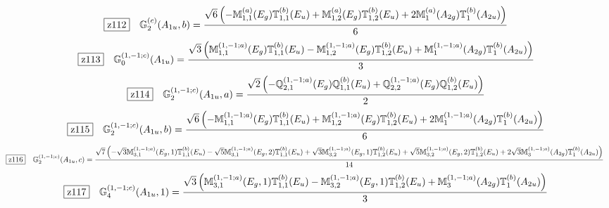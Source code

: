 \documentclass[fleqn,10pt,landscape]{jsarticle}
\begin{document}
\begin{dmath*}
\hspace*{3mm}\fbox{z112}\quad \mathbb{G}_{2}^{(c)}(A_{1u},b)=\frac{\sqrt{6} \left(- \mathbb{M}_{1,1}^{(a)}(E_{g}) \mathbb{T}_{1,1}^{(b)}(E_{u}) + \mathbb{M}_{1,2}^{(a)}(E_{g}) \mathbb{T}_{1,2}^{(b)}(E_{u}) + 2 \mathbb{M}_{1}^{(a)}(A_{2g}) \mathbb{T}_{1}^{(b)}(A_{2u})\right)}{6}
\end{dmath*}
\begin{dmath*}
\hspace*{3mm}\fbox{z113}\quad \mathbb{G}_{0}^{(1,-1;c)}(A_{1u})=\frac{\sqrt{3} \left(\mathbb{M}_{1,1}^{(1,-1;a)}(E_{g}) \mathbb{T}_{1,1}^{(b)}(E_{u}) - \mathbb{M}_{1,2}^{(1,-1;a)}(E_{g}) \mathbb{T}_{1,2}^{(b)}(E_{u}) + \mathbb{M}_{1}^{(1,-1;a)}(A_{2g}) \mathbb{T}_{1}^{(b)}(A_{2u})\right)}{3}
\end{dmath*}
\begin{dmath*}
\hspace*{3mm}\fbox{z114}\quad \mathbb{G}_{2}^{(1,-1;c)}(A_{1u},a)=\frac{\sqrt{2} \left(- \mathbb{Q}_{2,1}^{(1,-1;a)}(E_{g}) \mathbb{Q}_{1,1}^{(b)}(E_{u}) + \mathbb{Q}_{2,2}^{(1,-1;a)}(E_{g}) \mathbb{Q}_{1,2}^{(b)}(E_{u})\right)}{2}
\end{dmath*}
\begin{dmath*}
\hspace*{3mm}\fbox{z115}\quad \mathbb{G}_{2}^{(1,-1;c)}(A_{1u},b)=\frac{\sqrt{6} \left(- \mathbb{M}_{1,1}^{(1,-1;a)}(E_{g}) \mathbb{T}_{1,1}^{(b)}(E_{u}) + \mathbb{M}_{1,2}^{(1,-1;a)}(E_{g}) \mathbb{T}_{1,2}^{(b)}(E_{u}) + 2 \mathbb{M}_{1}^{(1,-1;a)}(A_{2g}) \mathbb{T}_{1}^{(b)}(A_{2u})\right)}{6}
\end{dmath*}
\begin{dmath*}
\hspace*{3mm}\fbox{z116}\quad \mathbb{G}_{2}^{(1,-1;c)}(A_{1u},c)=\frac{\sqrt{7} \left(- \sqrt{3} \mathbb{M}_{3,1}^{(1,-1;a)}(E_{g},1) \mathbb{T}_{1,1}^{(b)}(E_{u}) - \sqrt{5} \mathbb{M}_{3,1}^{(1,-1;a)}(E_{g},2) \mathbb{T}_{1,1}^{(b)}(E_{u}) + \sqrt{3} \mathbb{M}_{3,2}^{(1,-1;a)}(E_{g},1) \mathbb{T}_{1,2}^{(b)}(E_{u}) + \sqrt{5} \mathbb{M}_{3,2}^{(1,-1;a)}(E_{g},2) \mathbb{T}_{1,2}^{(b)}(E_{u}) + 2 \sqrt{3} \mathbb{M}_{3}^{(1,-1;a)}(A_{2g}) \mathbb{T}_{1}^{(b)}(A_{2u})\right)}{14}
\end{dmath*}
\begin{dmath*}
\hspace*{3mm}\fbox{z117}\quad \mathbb{G}_{4}^{(1,-1;c)}(A_{1u},1)=\frac{\sqrt{3} \left(\mathbb{M}_{3,1}^{(1,-1;a)}(E_{g},1) \mathbb{T}_{1,1}^{(b)}(E_{u}) - \mathbb{M}_{3,2}^{(1,-1;a)}(E_{g},1) \mathbb{T}_{1,2}^{(b)}(E_{u}) + \mathbb{M}_{3}^{(1,-1;a)}(A_{2g}) \mathbb{T}_{1}^{(b)}(A_{2u})\right)}{3}
\end{dmath*}
\end{document}
